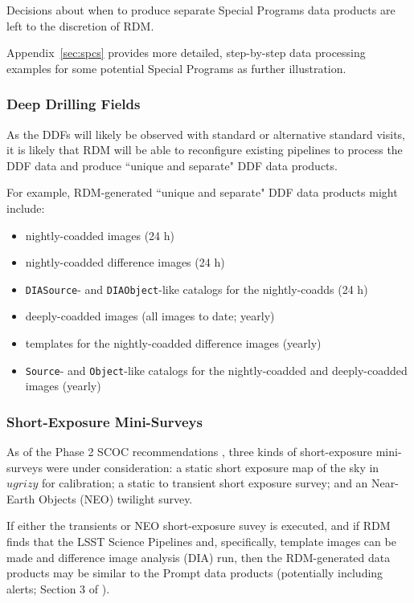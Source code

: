 Decisions about when to produce separate Special Programs data products are 
left to the discretion of RDM.

Appendix~\ref{sec:spcs} provides more detailed, step-by-step data processing examples for some potential Special Programs as further illustration. 


\subsubsection{Deep Drilling Fields}

As the DDFs will likely be observed with standard or alternative standard 
visits, it is likely that RDM will be able to reconfigure existing pipelines 
to process the DDF data and produce ``unique and separate" DDF data products.

For example, RDM-generated ``unique and separate" DDF data products might 
include:
\begin{itemize}
\item nightly-coadded images (24 h)
\item nightly-coadded difference images (24 h)
\item {\tt DIASource}- and {\tt DIAObject}-like catalogs for the nightly-coadds (24 h)
\item deeply-coadded images (all images to date; yearly)
\item templates for the nightly-coadded difference images (yearly)
\item {\tt Source}- and {\tt Object}-like catalogs for the nightly-coadded and deeply-coadded images (yearly)
\end{itemize}


\subsubsection{Short-Exposure Mini-Surveys}

As of the Phase 2 SCOC recommendations , three kinds of 
short-exposure mini-surveys were under consideration: 
a static short exposure map of the sky in $ugrizy$ for calibration; 
a static to transient short exposure survey; and 
an Near-Earth Objects (NEO) twilight survey.

If either the transients or NEO short-exposure suvey is executed, and if 
RDM finds that the LSST Science Pipelines and, specifically, template images 
can be made and difference image analysis (DIA) run, then the RDM-generated 
data products may be similar to the Prompt data products (potentially 
including alerts; Section 3 of ).

